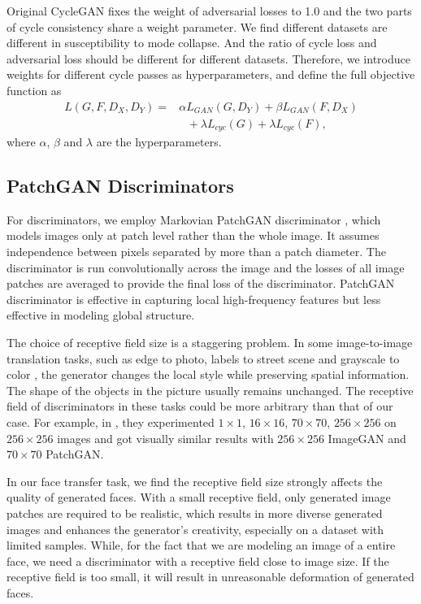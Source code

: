 \documentclass[letterpaper]{article} %
\begin{document}
	Original CycleGAN fixes the weight of adversarial losses to 1.0 and the two parts of cycle consistency share a weight parameter. We find different datasets are different in susceptibility to mode collapse. And the ratio of cycle loss and adversarial loss should be different for different datasets. Therefore, we introduce weights for different cycle passes as hyperparameters, and define the full objective function as
	\begin{align}
	L(G,F,D_X,D_Y) = &\alpha L_{GAN}(G,D_Y) + \beta L_{GAN}(F,D_X) \nonumber\\
	&~~~+ \lambda L_{cyc}(G)  + \lambda L_{cyc}(F),
	\end{align}
	where $\alpha$, $\beta$ and $\lambda$ are the hyperparameters.
	
	
	
	
	
	\subsection{PatchGAN Discriminators}
	For discriminators, we employ Markovian PatchGAN discriminator \cite{isola2016image,li2016precomputed},
	which models images only at patch level rather than the whole image. It assumes independence between pixels separated by more than a patch diameter. The discriminator is run convolutionally across the image and the losses of all image patches are averaged to provide the final loss of the discriminator. 
	PatchGAN discriminator is effective in capturing local high-frequency features but less effective in modeling global structure. 
	
	The choice of receptive field size is a staggering problem. In some image-to-image translation tasks, such as edge to photo, labels to street scene and grayscale to color \cite{isola2016image}, the generator changes the local style while preserving spatial information. The shape of the objects in the picture usually remains unchanged. The receptive field of discriminators in these tasks could be more arbitrary than that of our case. For example, in \cite{isola2016image}, they experimented $1\times1$, $16\times16$, $70\times70$, $256\times256$ on $256\times256$ images and got visually similar results with $256\times256$ ImageGAN and $70\times70$ PatchGAN.
	
	In our face transfer task, we find the receptive field size strongly affects the quality of generated faces. With a small receptive field, only generated image patches are required to be realistic, which results in more diverse generated images and enhances the generator's creativity, especially on a dataset with limited samples. While, for the fact that we are modeling an image of a entire face, we need a discriminator with a receptive field close to image size. If the receptive field is too small, it will result in unreasonable deformation of generated faces.  
	
\end{document}
